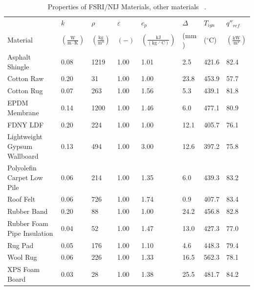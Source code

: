\clearpage


\begin{table}[!h]
\caption[Properties of FSRI/NIJ Materials, other materials]{Properties of FSRI/NIJ Materials, other materials ~\cite{McKinnon:FSRI2023_Data}.}
\centering
\begin{tabular}{|p{5.5cm}|p{1.0cm}|p{1.0cm}|p{0.8cm}|p{1.4cm}|p{1.0cm}|p{1.0cm}|p{1.2cm}|}
\hline
                                               & $k$    & $\rho$      & $\varepsilon$   & $c_{p}$ & $\Delta$    & $T_{ign}$ & $q''_{ref}$ \\
Material                                       & $\mathrm{\left(\frac{W}{m\cdot K}\right)}$ & $\mathrm{\left(\frac{kg}{m^{3}}\right)}$ & $\mathrm{( - )}$ & $\mathrm{\left(\frac{kJ}{(kg\cdot ^{\circ}C)}\right)}$ &  ($\mathrm{mm}$)   & ($\mathrm{^{\circ}C}$) & $\mathrm{\left(\frac{kW}{m^{2}}\right)}$ \\ \hline
\hline
Asphalt Shingle & 0.08 & 1219 & 1.00 & 1.01 & 2.5& 421.6 & 82.4 \\ \hline
Cotton Raw & 0.20 & 31 & 1.00 & 1.00 & 23.8 & 453.9 & 57.7 \\ \hline
Cotton Rug & 0.07 & 263 & 1.00 & 1.56 & 5.3 & 439.1 & 81.8 \\ \hline
EPDM Membrane & 0.14 & 1200 & 1.00 & 1.46 & 6.0 & 477.1 & 80.9 \\ \hline
FDNY LDF & 0.20 & 224 & 1.00 & 1.00 & 12.1 & 405.7 & 76.1 \\ \hline
Lightweight Gypsum Wallboard & 0.13 & 494 & 1.00 & 3.00 & 12.6 & 397.2 & 75.8 \\ \hline
Polyolefin Carpet Low Pile & 0.06 & 214 & 1.00 & 1.35 & 6.0 & 439.3 & 83.2 \\ \hline
Roof Felt & 0.06 & 726 & 1.00 & 1.74 & 0.9 & 407.7 & 83.4 \\ \hline
Rubber Band & 0.20 & 88 & 1.00 & 1.00 & 24.2 & 456.8 & 82.8 \\ \hline
Rubber Foam Pipe Insulation & 0.04 & 52 & 1.00 & 1.47 & 13.0 & 427.3 & 77.0 \\ \hline
Rug Pad & 0.05 & 176 & 1.00 & 1.10 & 4.6 & 448.3 & 79.4 \\ \hline
Wool Rug & 0.06 & 226 & 1.00 & 1.33 & 16.5 & 562.3 & 78.1 \\ \hline
XPS Foam Board & 0.03 & 28 & 1.00 & 1.38 & 25.5 & 481.7 & 84.2 \\ \hline
\end{tabular}
\label{Properties_FSRI_NIJ_Materials_others}
\end{table}

